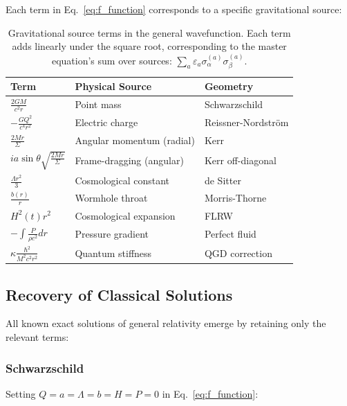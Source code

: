 \documentclass[11pt,a4paper]{article}
\theoremstyle{definition}
\theoremstyle{remark}
\begin{document}
	Each term in Eq.~\eqref{eq:f_function} corresponds to a specific gravitational source:
	
	\begin{table}[h]
		\centering
		\begin{tabular}{lll}
			\toprule
			Term & Physical Source & Geometry \\
			\midrule
			$\displaystyle\frac{2GM}{c^2r}$ & Point mass & Schwarzschild \\[4pt]
			$\displaystyle-\frac{GQ^2}{c^4r^2}$ & Electric charge & Reissner-Nordström \\[4pt]
			$\displaystyle\frac{2Mr}{\Sigma}$ & Angular momentum (radial) & Kerr \\[4pt]
			$\displaystyle ia\sin\theta\sqrt{\frac{2Mr}{\Sigma}}$ & Frame-dragging (angular) & Kerr off-diagonal \\[4pt]
			$\displaystyle\frac{\Lambda r^2}{3}$ & Cosmological constant & de Sitter \\[4pt]
			$\displaystyle\frac{b(r)}{r}$ & Wormhole throat & Morris-Thorne \\[4pt]
			$\displaystyle H^2(t)r^2$ & Cosmological expansion & FLRW \\[4pt]
			$\displaystyle-\int\frac{P}{\rho c^2}dr$ & Pressure gradient & Perfect fluid \\[4pt]
			$\displaystyle\kappa\frac{\hbar^2}{M^2c^2r^2}$ & Quantum stiffness & QGD correction \\
			\bottomrule
		\end{tabular}
		\caption{Gravitational source terms in the general wavefunction. Each term adds linearly under the square root, corresponding to the master equation's sum over sources: $\sum_a \varepsilon_a \sigma_\alpha^{(a)}\sigma_\beta^{(a)}$.}
		\label{tab:source_terms}
	\end{table}
	
	\subsection{Recovery of Classical Solutions}
	
	All known exact solutions of general relativity emerge by retaining only the relevant terms:
	
	\subsubsection{Schwarzschild}
	
	Setting $Q = a = \Lambda = b = H = P = 0$ in Eq.~\eqref{eq:f_function}:
	
\end{document}
